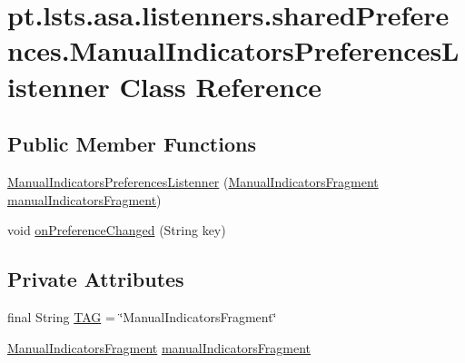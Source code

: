 \hypertarget{classpt_1_1lsts_1_1asa_1_1listenners_1_1sharedPreferences_1_1ManualIndicatorsPreferencesListenner}{}\section{pt.\+lsts.\+asa.\+listenners.\+shared\+Preferences.\+Manual\+Indicators\+Preferences\+Listenner Class Reference}
\label{classpt_1_1lsts_1_1asa_1_1listenners_1_1sharedPreferences_1_1ManualIndicatorsPreferencesListenner}
\subsection*{Public Member Functions}
\begin{DoxyCompactItemize}
\item 
\hyperlink{classpt_1_1lsts_1_1asa_1_1listenners_1_1sharedPreferences_1_1ManualIndicatorsPreferencesListenner_a56003aac41995d1a0b87802f780abbb4}{Manual\+Indicators\+Preferences\+Listenner} (\hyperlink{classpt_1_1lsts_1_1asa_1_1fragments_1_1ManualIndicatorsFragment}{Manual\+Indicators\+Fragment} \hyperlink{classpt_1_1lsts_1_1asa_1_1listenners_1_1sharedPreferences_1_1ManualIndicatorsPreferencesListenner_a692b57da2ec3941964c20b4c754a0f4f}{manual\+Indicators\+Fragment})
\item 
void \hyperlink{classpt_1_1lsts_1_1asa_1_1listenners_1_1sharedPreferences_1_1ManualIndicatorsPreferencesListenner_a1762a42c1abf582bc4d43f9b464dcbb1}{on\+Preference\+Changed} (String key)
\end{DoxyCompactItemize}
\subsection*{Private Attributes}
\begin{DoxyCompactItemize}
\item 
final String \hyperlink{classpt_1_1lsts_1_1asa_1_1listenners_1_1sharedPreferences_1_1ManualIndicatorsPreferencesListenner_a64c5d32962fb3999c7942632851dbf15}{T\+A\+G} = \char`\"{}Manual\+Indicators\+Fragment\char`\"{}
\item 
\hyperlink{classpt_1_1lsts_1_1asa_1_1fragments_1_1ManualIndicatorsFragment}{Manual\+Indicators\+Fragment} \hyperlink{classpt_1_1lsts_1_1asa_1_1listenners_1_1sharedPreferences_1_1ManualIndicatorsPreferencesListenner_a692b57da2ec3941964c20b4c754a0f4f}{manual\+Indicators\+Fragment}
\end{DoxyCompactItemize}



